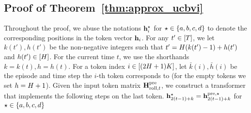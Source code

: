 \subsection{Proof of Theorem~\ref{thm:approx_ucbvi}}\label{sec:pf_approx_ucbvi}
Throughout the proof, we abuse the notations ${\mathbf h}_i^{\star}$ for $\star\in\{{a},{b},{c},{d}\}$ to denote the corresponding positions in the token vector ${\mathbf h}_i$. For any $t'\in[{T}]$, we let $k(t'),h(t')$ be the non-negative integers such that $t'={H}(k(t')-1)+h(t')$ and $h(t')\in[{H}]$. For the current time $t$, we use the shorthands $k=k(t),h=h(t)$.  For a token index $i\in[(2{H}+1){K}]$, let $\bar{k}(i),\bar{h}(i)$ be the episode and time step the $i$-th token corresponds to (for the empty tokens we set $h={H}+1$).
Given the input token matrix ${\mathbf H}^{\mathrm{pre}}_{{\mathrm{roll}},t}$, we construct a transformer that implements the following steps on the last token.
${\mathbf h}^{\star}_{2(t-1)+k}={\mathbf h}^{{\mathrm{pre}},\star}_{2(t-1)+k}$ for $\star\in\{{a},{b},{c},{d}\}$
